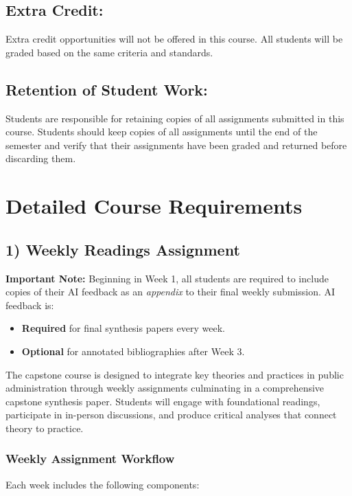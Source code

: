 \documentclass[12pt]{article}     %
\begin{document}
	\subsection*{Extra Credit:}
		Extra credit opportunities will not be offered in this course. All students will be graded based on the same criteria and standards.

	\subsection*{Retention of Student Work:}
		Students are responsible for retaining copies of all assignments submitted in this course. Students should keep copies of all assignments until the end of the semester and verify that their assignments have been graded and returned before discarding them.

\section{Detailed Course Requirements}

\subsection*{1) Weekly Readings Assignment}

\textbf{Important Note:} Beginning in Week 1, all students are required to include copies of their AI feedback as an \emph{appendix} to their final weekly submission. AI feedback is:
\begin{itemize}
    \item \textbf{Required} for final synthesis papers every week.
    \item \textbf{Optional} for annotated bibliographies after Week 3.
\end{itemize}

The capstone course is designed to integrate key theories and practices in public administration through weekly assignments culminating in a comprehensive capstone synthesis paper. Students will engage with foundational readings, participate in in-person discussions, and produce critical analyses that connect theory to practice.

\subsubsection*{Weekly Assignment Workflow}

Each week includes the following components:
\end{document}
